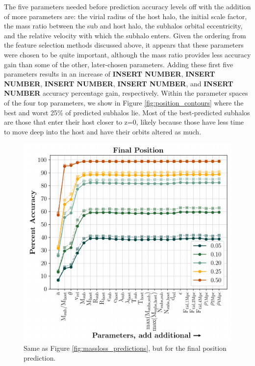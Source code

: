\documentclass[fleqn,usenatbib]{mnras}
\begin{document}
The five parameters needed before prediction accuracy levels off with the addition of more parameters are: the virial radius of the host halo, the initial scale factor, the mass ratio between the sub and host halo, the subhalos orbital eccentricity, and the relative velocity with which the subhalo enters. Given the ordering from the feature selection methods discussed above, it appears that these parameters were chosen to be quite important, although the mass ratio provides less accuracy gain than some of the other, later-chosen parameters. Adding these first five parameters results in an increase of \textbf{INSERT NUMBER}, \textbf{INSERT NUMBER}, \textbf{INSERT NUMBER}, \textbf{INSERT NUMBER}, and  \textbf{INSERT NUMBER} accuracy percentage gain, respectively. Within the parameter spaces of the four top parameters, we show in Figure \ref{fig:position_contours} where the best and worst 25\% of predicted subhalos lie. Most of the best-predicted subhalos are those that enter their host closer to z=0, likely because those have less time to move deep into the host and have their orbits altered as much. 

\begin{figure}
	\includegraphics[width=\columnwidth]{Figures/position_predictions}
    \caption{Same as Figure \ref{fig:massloss_predictions}, but for the final position prediction.}
    \label{fig:position_predictions}
\end{figure}
\end{document}

